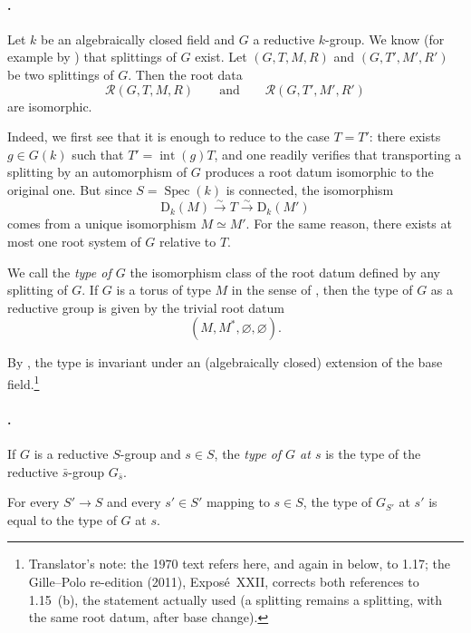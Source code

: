 \paragraph{.}
Let \(k\) be an algebraically closed field and \(G\) a reductive
\(k\)-group. We know \textup{(for example by )} that splittings of
\(G\) exist. Let \((G,T,M,R)\) and \((G,T',M',R')\) be two splittings
of \(G\). Then the root data
\[
  \mathcal R(G,T,M,R)
  \qquad\text{and}\qquad
  \mathcal R(G,T',M',R')
\]
are isomorphic.

Indeed, we first see that it is enough to reduce to the case
\(T=T'\): there exists \(g\in G(k)\) such that
\(T'=\operatorname{int}(g)T\), and one readily verifies that
transporting a splitting by an automorphism of \(G\) produces a root
datum isomorphic to the original one. But since
\(S=\operatorname{Spec}(k)\) is connected, the isomorphism
\[
  \mathrm D_k(M)\xrightarrow{\sim}T
  \xrightarrow{\sim}\mathrm D_k(M')
\]
comes from a unique isomorphism \(M\simeq M'\). For the same reason,
there exists at most one root system of \(G\) relative to \(T\).

We call the \emph{type of \(G\)} the isomorphism class of the root
datum defined by any splitting of \(G\). If \(G\) is a torus of type
\(M\) in the sense of , then the type of \(G\) as a
reductive group is given by the trivial root datum
\[
  (M,M^*,\varnothing,\varnothing).
\]

By , the type is invariant under an
\textup{(algebraically closed)} extension of the base field.\footnote{Translator's note: the 1970 text
refers here, and again in  below, to 1.17; the Gille--Polo
re-edition (2011), Exposé~XXII, corrects both references to 1.15~(b), the
statement actually used (a splitting remains a splitting, with the same root
datum, after base change).}

\paragraph{.}
If \(G\) is a reductive \(S\)-group and \(s\in S\), the \emph{type of
\(G\) at \(s\)} is the type of the reductive
\(\bar s\)-group \(G_{\bar s}\).

For every \(S'\to S\) and every \(s'\in S'\) mapping to \(s\in S\),
the type of \(G_{S'}\) at \(s'\) is equal to the type of \(G\) at
\(s\).

